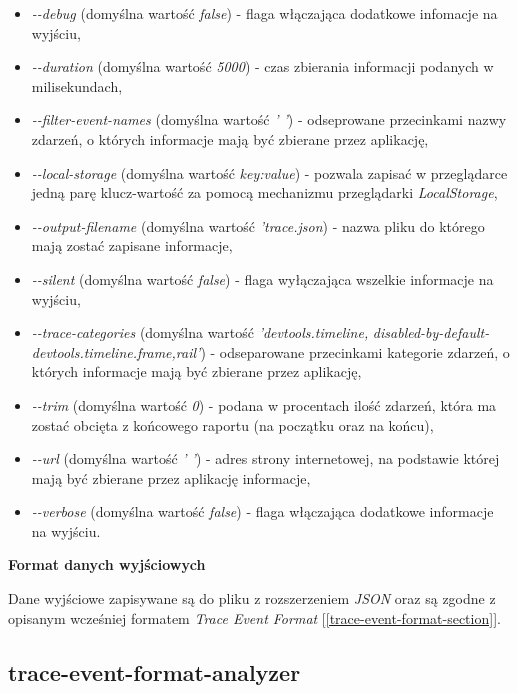 \documentclass[polish, twoside, 12pt]{mwart}
\begin{document}
\begin{itemize}
  \item \emph{-{}-debug} (domyślna wartość \emph{false}) - flaga włączająca dodatkowe infomacje na wyjściu,
  \item \emph{-{}-duration} (domyślna wartość \emph{5000}) - czas zbierania informacji podanych w milisekundach,
  \item \emph{-{}-filter-event-names} (domyślna wartość \emph{' '}) - odseprowane przecinkami nazwy zdarzeń, o których informacje mają być zbierane przez aplikację,
  \item \emph{-{}-local-storage} (domyślna wartość \emph{key:value}) - pozwala zapisać w przeglądarce jedną parę klucz-wartość za pomocą mechanizmu przeglądarki \emph{LocalStorage},
  \item \emph{-{}-output-filename} (domyślna wartość \emph{'trace.json}) - nazwa pliku do którego mają zostać zapisane informacje,
  \item \emph{-{}-silent} (domyślna wartość \emph{false}) - flaga wyłączająca wszelkie informacje na wyjściu,
  \item \emph{-{}-trace-categories} (domyślna wartość \emph{'devtools.timeline,} \newline \emph{disabled-by-default-devtools.timeline.frame,rail'}) - odseparowane przecinkami kategorie zdarzeń, o których informacje mają być zbierane przez aplikację,
  \item \emph{-{}-trim} (domyślna wartość \emph{0}) - podana w procentach ilość zdarzeń, która ma zostać obcięta z końcowego raportu (na początku oraz na końcu),
  \item \emph{-{}-url} (domyślna wartość \emph{' '}) - adres strony internetowej, na podstawie której mają być zbierane przez aplikację informacje,
  \item \emph{-{}-verbose} (domyślna wartość \emph{false}) - flaga włączająca dodatkowe informacje na wyjściu.
\end{itemize}

\textbf{Format danych wyjściowych} \newline

Dane wyjściowe zapisywane są do pliku z rozszerzeniem \emph{JSON} oraz są zgodne z opisanym wcześniej formatem \emph
{Trace Event Format} [\ref{trace-event-format-section}].

\subsection{trace-event-format-analyzer}
\end{document}
